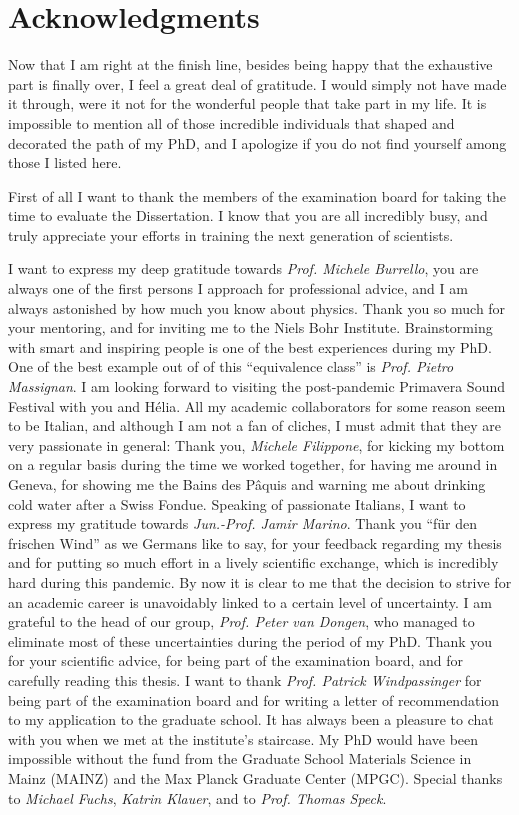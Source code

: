 \chapter*{Acknowledgments}
Now that I am right at the finish line, besides being happy that the exhaustive part is finally over, I feel a great deal of gratitude.
I would simply not have made it through, were it not for the wonderful people that take part in my life.
It is impossible to mention all of those incredible individuals that shaped and decorated the path of my PhD, and I apologize if you do not find yourself among those I listed here.

First of all I want to thank the members of the examination board for taking the time to evaluate the Dissertation.
I know that you are all incredibly busy, and truly appreciate your efforts in training the next generation of scientists.

I want to express my deep gratitude towards {\it Prof. Michele Burrello}, you are always one of the first persons I approach for professional advice, and I am always astonished by how much you know about physics.
Thank you so much for your mentoring, and for inviting me to the Niels Bohr Institute.
Brainstorming with smart and inspiring people is one of the best experiences during my PhD.
One of the best example out of of this ``equivalence class'' is {\it Prof. Pietro Massignan}.
I am looking forward to visiting the post-pandemic Primavera Sound Festival with you and Hélia.
All my academic collaborators for some reason seem to be Italian, and although I am not a fan of cliches, I must admit that they are very passionate in general:
Thank you, {\it Michele Filippone}, for kicking my bottom on a regular basis during the time we worked together, for having me around in Geneva, for showing me the Bains des Pâquis and warning me about drinking cold water after a Swiss Fondue.
Speaking of passionate Italians, I want to express my gratitude towards {\it Jun.-Prof. Jamir Marino}.
Thank you ``für den frischen Wind'' as we Germans like to say, for your feedback regarding my thesis and for putting so much effort in a lively scientific exchange, which is incredibly hard during this pandemic.
By now it is clear to me that the decision to strive for an academic career is unavoidably linked to a certain level of uncertainty.
I am grateful to the head of our group, {\it Prof. Peter van Dongen}, who managed to eliminate most of these uncertainties during the period of my PhD.
Thank you for your scientific advice, for being part of the examination board, and for carefully reading this thesis.
I want to thank {\it Prof. Patrick Windpassinger} for being part of the examination board and for writing a letter of recommendation to my application to the graduate school.
It has always been a pleasure to chat with you when we met at the institute's staircase.
My PhD would have been impossible without the fund from the Graduate School Materials Science in Mainz (MAINZ) and the Max Planck Graduate Center (MPGC).
Special thanks to {\it Michael Fuchs}, {\it Katrin Klauer}, and to {\it Prof. Thomas Speck}.

